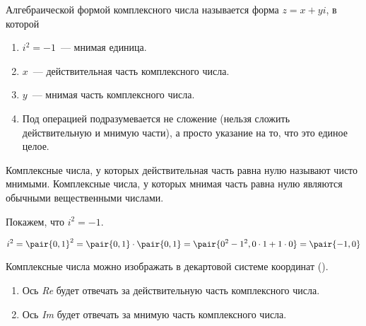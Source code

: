 \begin{definition}
  Алгебраической формой комплексного числа называется форма \(z = x + yi\), в
  которой
  
  \begin{enumerate}
  \item
    \(i^2 = -1\)~--- мнимая единица.
    
  \item
    \(x\)~--- действительная часть комплексного числа.
    
  \item
    \(y\)~--- мнимая часть комплексного числа.
    
  \item
    Под операцией \quote{\(+\)} подразумевается не сложение (нельзя сложить
    действительную и мнимую части), а просто указание на то, что это единое
    целое.
  \end{enumerate}
\end{definition}

\begin{remark}
  Комплексные числа, у которых действительная часть равна нулю называют чисто
  мнимыми. Комплексные числа, у которых мнимая часть равна нулю являются
  обычными вещественными числами.
\end{remark}

\begin{remark}
  Покажем, что \(i^2 = -1\).

  \begin{equation*}
    i^2
    = \pair{0, 1}^2
    = \pair{0, 1} \cdot \pair{0, 1}
    = \pair{0^2 - 1^2, 0 \cdot 1 + 1 \cdot 0}
    = \pair{-1, 0}
  \end{equation*}
\end{remark}

\begin{remark}
  Комплексные числа можно изображать в декартовой системе координат
  ().
  
  \begin{enumerate}
  \item
    Ось \textit{Re} будет отвечать за действительную часть комплексного числа.
    
  \item
    Ось \textit{Im} будет отвечать за мнимую часть комплексного числа.
  \end{enumerate}
\end{remark}

